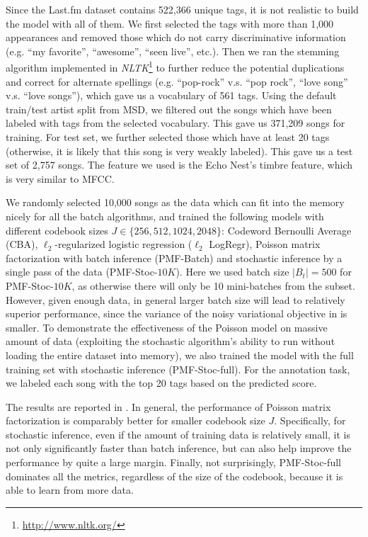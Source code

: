 Since the Last.fm dataset contains 522,366 unique tags, it is not realistic to build the model with all of them. We first selected the tags with more than 1,000 appearances and removed those which do not carry discriminative information (e.g. ``my favorite'', ``awesome'', ``seen live'', etc.). Then we ran the stemming algorithm implemented in \emph{NLTK}\footnote{\url{http://www.nltk.org/}} to further reduce the potential duplications and correct for alternate spellings (e.g. ``pop-rock'' v.s. ``pop rock'', ``love song'' v.s. ``love songs''), which gave us a vocabulary of 561 tags. Using the default train/test artist split from MSD, we filtered out the songs which have been labeled with tags from the selected vocabulary. This gave us 371,209 songs for training. For test set, we further selected those which have at least 20 tags (otherwise, it is likely that this song is very weakly labeled). This gave us a test set of 2,757 songs. The feature we used is the Echo Nest's timbre feature, which is very similar to MFCC. 

We randomly selected 10,000 songs as the data which can fit into the memory nicely for all the batch algorithms, and trained the following models with different codebook sizes $J \in \{256, 512, 1024, 2048 \}$: Codeword Bernoulli Average (CBA), $\ell_2$-regularized logistic regression ($\ell_2$ LogRegr), Poisson matrix factorization with batch inference (PMF-Batch) and stochastic inference by a single pass of the data (PMF-Stoc-$10K$). Here we used batch size $|B_t| = 500$ for PMF-Stoc-$10K$, as otherwise there will only be 10 mini-batches from the subset. However, given enough data, in general larger batch size will lead to relatively superior performance, since the variance of the noisy variational objective in  is smaller. To demonstrate the effectiveness of the Poisson model on massive amount of data (exploiting the stochastic algorithm's ability to run without loading the entire dataset into memory), we also trained the model with the full training set with stochastic 
inference (PMF-Stoc-full). For the annotation task, we labeled each song with the top 20 tags based on the predicted score. 

The results are reported in . In general, the performance of Poisson matrix factorization is comparably better for smaller codebook size $J$. Specifically, for stochastic inference, even if the amount of training data is relatively small,  it is not only significantly faster than batch inference, but can also help improve the performance by quite a large margin. Finally, not surprisingly, PMF-Stoc-full dominates all the metrics, regardless of the size of the codebook, because it is able to learn from more data. 


